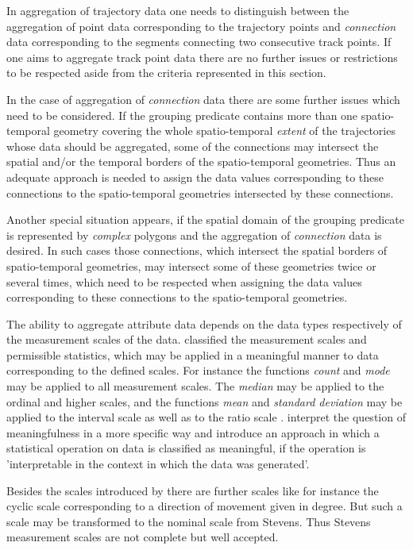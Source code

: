 \documentclass[12pt, oneside, a4paper]{scrbook}
\begin{document}
In aggregation of trajectory data one needs to distinguish between the aggregation of point data corresponding to the trajectory points and \textit{connection} data corresponding to the segments connecting two consecutive track points.
If one aims to aggregate track point data there are no further issues or restrictions to be respected aside from the criteria represented in this section.
\par\medskip
In the case of aggregation of \textit{connection} data there are some further issues which need to be considered. If the grouping predicate contains more than one spatio-temporal geometry covering the whole spatio-temporal \textit{extent} of the trajectories whose data should be aggregated, some of the connections may intersect the spatial and/or the temporal borders of the spatio-temporal geometries.
Thus an adequate approach is needed to assign the data values corresponding to these connections to the spatio-temporal geometries intersected by these connections. 
\par\medskip
Another special situation appears, if the spatial domain of the grouping predicate is represented by \textit{complex} polygons and the aggregation of \textit{connection} data is desired. 
In such cases those connections, which intersect the spatial borders of spatio-temporal geometries, may intersect some of these geometries twice or several times, which need to be respected when assigning the data values corresponding to these connections to the spatio-temporal geometries.
\par\medskip



The ability to aggregate attribute data depends on the data types respectively of the measurement scales of the data. 
\citet{stevens_theory_1946} classified the measurement scales and permissible statistics, which may be applied in a meaningful manner to data corresponding to the defined scales. 
For instance the functions \textit{count} and \textit{mode} may be applied to all measurement scales.
The \textit{median} may be applied to the ordinal and higher scales, and the functions \textit{mean} and \textit{standard deviation} may be applied to the interval scale as well as to the ratio scale \citep{stevens_theory_1946}.
\citet{stasch_meaningful_2014} interpret the question of meaningfulness in a more specific way and introduce an approach in which a statistical operation on data is classified as meaningful, if the operation is 'interpretable in the context in which the data was generated'.
\par\medskip
Besides the scales introduced by \citet{stevens_theory_1946} there are further scales like for instance the cyclic scale corresponding to a direction of movement given in degree. But such a scale may be transformed to the nominal scale from Stevens. Thus Stevens measurement scales are not complete but well accepted.
\par\medskip
\end{document}
